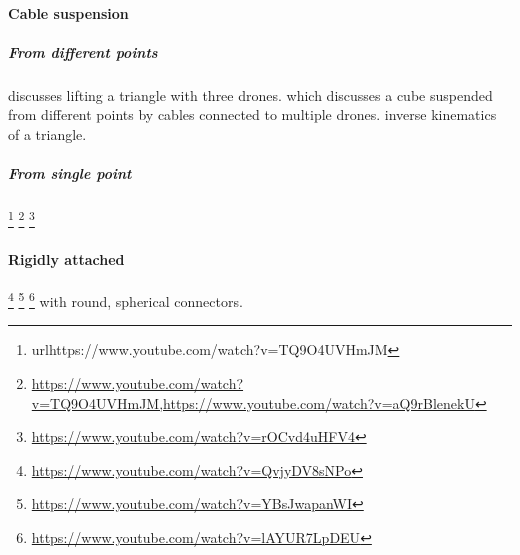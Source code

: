 \documentclass{article}
\begin{document}
		\paragraph{Cable suspension}
		\subparagraph{From different points}
		\cite{michael-2009-cooperative-manipulation-and-transportation-with-aerial-robots} discusses lifting a triangle with three drones. 
		\cite{masone-2016-cooperative-transportation-of-a-payload-using-quadrotors-a-reconfigurable-cable-driven-parallel-robot} which discusses a cube suspended from different points by cables connected to multiple drones.
		\cite{mohiuddin-2020-energy-distribution-in-dual-uav-collaborative-transportation-through-load-sharing}
		\cite{jiang-2013-the-inverse-kinematics-of-cooperative-transport-with-multiple-aerial-robots} inverse kinematics of a triangle.
		\cite{sreenath-2013-dynamics-control-and-planning-for-cooperative-manipulation-of-payloads-suspended-by-cables-from-multiple-quadrotor-robots}
		\subparagraph{From single point}
		\cite{jackson-2020-scalable-cooperative-transport-of-cable-suspended-loads-with-uavs-using-distributed-trajectory-optimization}
		\cite{guerrero-2015-passivity-based-control-for-a-quadrotor-uav-transporting-a-cable-suspended-payload-with-minimum-swing}\footnote{url{https://www.youtube.com/watch?v=TQ9O4UVHmJM}}
		\cite{mohammadi-2020-control-of-multiple-quad-copters-with-a-cable-suspended-payload-subject-to-disturbances}
		\footnote{\url{https://www.youtube.com/watch?v=TQ9O4UVHmJM,https://www.youtube.com/watch?v=aQ9rBlenekU}}
		\cite{mohammadi-2018-decentralized-motion-control-in-a-cabled-based-multi-drone-load-transport-system}
		\cite{marina-2019-flexible-collaborative-transportation-by-a-team-of-rotorcraft}
		\cite{erskine-2019-wrench-analysis-of-cable-suspended-parallel-robots-actuated-by-quadrotor-unmanned-aerial-vehicles} \footnote{\url{https://www.youtube.com/watch?v=rOCvd4uHFV4}}
		\cite{thapa-2019-cooperative-aerial-load-transport-with-attitude-stabilization}
		\cite{xie-2020-towards-cooperative-transport-of-a-suspended-payload-via-two-aerial-robots-with-inertial-sensing} 
		
		\paragraph{Rigidly attached}
		\cite{mellinger-2010-cooperative-grasping-and-transport-using-multiple-quadrotors}
		\cite{loianno-2017-cooperative-transportation-using-small-quadrotors-using-monocular-vision-and-inertial-sensing}
		\cite{tagliabue-2017-robust-collaborative-object-transportation-using-multiple-mavs}\footnote{\url{https://www.youtube.com/watch?v=QvjyDV8sNPo}}
		\cite{mellinger-2010-cooperative-grasping-and-transport-using-multiple-quadrotors}\footnote{\url{https://www.youtube.com/watch?v=YBsJwapanWI}}
		\cite{nguyen-2015-aerial-tool-operation-system-using-quadrotors-as-rotating-thrust-generators}\footnote{\url{https://www.youtube.com/watch?v=lAYUR7LpDEU}} with round, spherical connectors. 
	
\end{document}
